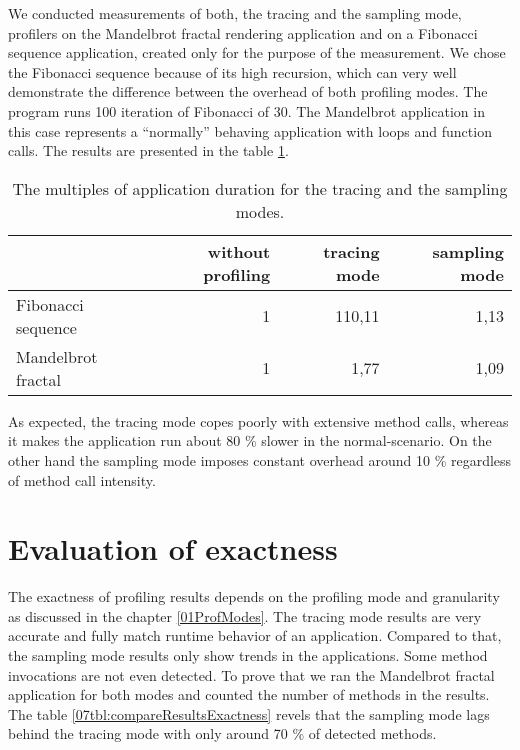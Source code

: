 We conducted measurements of both, the tracing and the sampling mode, profilers on the Mandelbrot fractal rendering application and on a Fibonacci sequence application, created only for the purpose of the measurement. We chose the Fibonacci sequence because of its high recursion, which can very well demonstrate the difference between the overhead of both profiling modes. The program runs 100 iteration of Fibonacci of 30. The Mandelbrot application in this case represents a ``normally'' behaving application with loops and function calls. The results are presented in the table \ref{07tbl:compareResults}. 

\begin{table}
\centering
    \begin{tabular}{|l|r|r|r|}
        \hline
        ~                  & without profiling & tracing mode & sampling mode \\ \hline
        Fibonacci sequence & 1                 & 110,11       & 1,13          \\ 
        Mandelbrot fractal & 1                 & 1,77         & 1,09          \\
        \hline
    \end{tabular}
    \caption{The multiples of application duration for the tracing and the sampling modes. }
    \label{07tbl:compareResults}
\end{table}
 
As expected, the tracing mode copes poorly with extensive method calls, whereas it makes the application run about 80 \% slower in the normal-scenario. On the other hand the sampling mode imposes constant overhead around 10 \% regardless of method call intensity.

\section{Evaluation of exactness}
The exactness of profiling results depends on the profiling mode and granularity as discussed in the chapter \ref{01ProfModes}. The tracing mode results are very accurate and fully match runtime behavior of an application. Compared to that, the sampling mode results only show trends in the applications. Some method invocations are not even detected. To prove that we ran the Mandelbrot fractal application for both modes and counted the number of methods in the results. The table \ref{07tbl:compareResultsExactness} revels that the sampling mode lags behind the tracing mode with only around 70 \% of detected methods.

